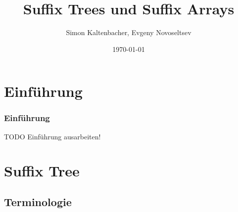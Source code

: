 \documentclass{beamer}
\title{Suffix Trees und Suffix Arrays}
\author{Simon Kaltenbacher, Evgeny Novoseltsev}
\date{\today}
\begin{document}
\frame{\titlepage}


\section{Einführung}

\begin{frame}
\frametitle{Einführung}
TODO Einführung ausarbeiten!
\end{frame}

\section{Suffix Tree}

\frame{\sectionpage}

\subsection{Terminologie}
\end{document}
